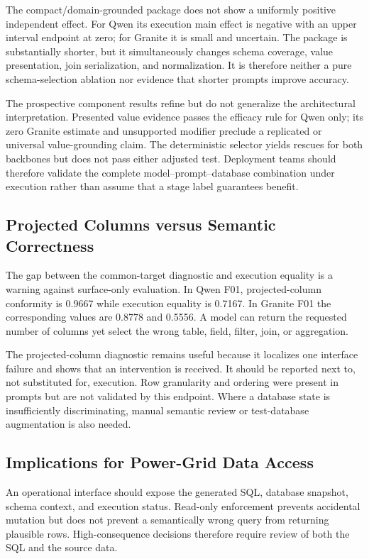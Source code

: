 \documentclass[applsci,article,submit,moreauthors]{Definitions/mdpi}
\begin{document}
The compact/domain-grounded package does not show a uniformly positive independent effect. For Qwen its execution main effect is negative with an upper interval endpoint at zero; for Granite it is small and uncertain. The package is substantially shorter, but it simultaneously changes schema coverage, value presentation, join serialization, and normalization. It is therefore neither a pure schema-selection ablation nor evidence that shorter prompts improve accuracy.

The prospective component results refine but do not generalize the architectural interpretation. Presented value evidence passes the efficacy rule for Qwen only; its zero Granite estimate and unsupported modifier preclude a replicated or universal value-grounding claim. The deterministic selector yields rescues for both backbones but does not pass either adjusted test. Deployment teams should therefore validate the complete model--prompt--database combination under execution rather than assume that a stage label guarantees benefit.

\subsection{Projected Columns versus Semantic Correctness}
The gap between the common-target diagnostic and execution equality is a warning against surface-only evaluation. In Qwen F01, projected-column conformity is 0.9667 while execution equality is 0.7167. In Granite F01 the corresponding values are 0.8778 and 0.5556. A model can return the requested number of columns yet select the wrong table, field, filter, join, or aggregation.

The projected-column diagnostic remains useful because it localizes one interface failure and shows that an intervention is received. It should be reported next to, not substituted for, execution. Row granularity and ordering were present in prompts but are not validated by this endpoint. Where a database state is insufficiently discriminating, manual semantic review or test-database augmentation is also needed.

\subsection{Implications for Power-Grid Data Access}
An operational interface should expose the generated SQL, database snapshot, schema context, and execution status. Read-only enforcement prevents accidental mutation but does not prevent a semantically wrong query from returning plausible rows. High-consequence decisions therefore require review of both the SQL and the source data.
\end{document}
